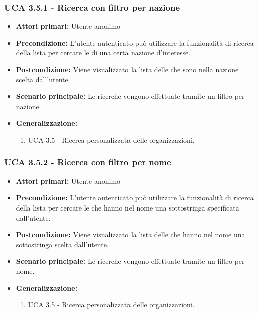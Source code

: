 \subsubsection{UCA 3.5.1 - Ricerca con filtro per nazione}%
\begin{itemize}
	\item \textbf{Attori primari:} Utente anonimo
	\item \textbf{Precondizione:} L'utente autenticato può utilizzare la funzionalità di ricerca della lista per cercare le  di una certa nazione d'interesse.
	\item \textbf{Postcondizione:} Viene visualizzato la lista delle  che sono nella nazione scelta dall'utente.
	\item \textbf{Scenario principale:} Le ricerche vengono effettuate tramite un filtro per nazione.
	\item \textbf{Generalizzazione:}
	\begin{enumerate}
	\item UCA 3.5 - Ricerca personalizzata delle organizzazioni.
	\end{enumerate}	
\end{itemize}

\subsubsection{UCA 3.5.2 - Ricerca con filtro per nome}%
\begin{itemize}
	\item \textbf{Attori primari:} Utente anonimo
	\item \textbf{Precondizione:} L'utente autenticato può utilizzare la funzionalità di ricerca della lista per cercare le  che hanno nel nome una sottostringa specificata dall'utente.
	\item \textbf{Postcondizione:} Viene visualizzato la lista delle  che hanno nel nome una sottostringa scelta dall'utente.
	\item \textbf{Scenario principale:} Le ricerche vengono effettuate tramite un filtro per nome.
	\item \textbf{Generalizzazione:}
	\begin{enumerate}
	\item UCA 3.5 - Ricerca personalizzata delle organizzazioni.
	\end{enumerate}	
\end{itemize}

